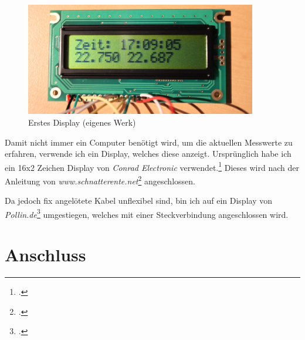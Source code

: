 \begin{figure}[h]
  \centering
     \includegraphics[width=0.9\textwidth]{figures/erstes_display.jpg}
  \caption{Erstes Display (eigenes Werk)}
  \label{fig:erstes_display}
\end{figure}

Damit nicht immer ein Computer benötigt wird, um die aktuellen Messwerte zu erfahren, verwende ich ein Display, welches diese anzeigt. Ursprünglich habe ich ein 16x2 Zeichen Display von \emph{Conrad Electronic} verwendet.\footcite{conrad_datenblatt}
Dieses wird nach der Anleitung von \emph{www.schnatterente.net}\footcite{schnatterente} angeschlossen.

Da jedoch fix angelötete Kabel unflexibel sind, bin ich auf ein Display von \emph{Pollin.de}\footcite{display_pollin} umgestiegen, welches mit einer Steckverbindung angeschlossen wird.

\section{Anschluss}
\label{sec:Anschluss}
